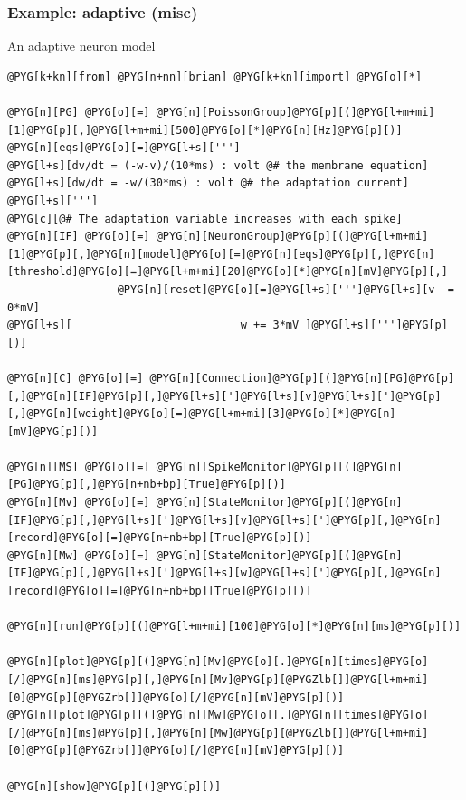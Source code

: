 \documentclass[letterpaper,10pt,english]{manual}
\begin{document}
\hypertarget{index-38}{}\subsubsection{Example: adaptive (misc)}

An adaptive neuron model

\begin{Verbatim}[commandchars=@\[\]]
@PYG[k+kn][from] @PYG[n+nn][brian] @PYG[k+kn][import] @PYG[o][*]

@PYG[n][PG] @PYG[o][=] @PYG[n][PoissonGroup]@PYG[p][(]@PYG[l+m+mi][1]@PYG[p][,]@PYG[l+m+mi][500]@PYG[o][*]@PYG[n][Hz]@PYG[p][)]
@PYG[n][eqs]@PYG[o][=]@PYG[l+s][''']
@PYG[l+s][dv/dt = (-w-v)/(10*ms) : volt @# the membrane equation]
@PYG[l+s][dw/dt = -w/(30*ms) : volt @# the adaptation current]
@PYG[l+s][''']
@PYG[c][@# The adaptation variable increases with each spike]
@PYG[n][IF] @PYG[o][=] @PYG[n][NeuronGroup]@PYG[p][(]@PYG[l+m+mi][1]@PYG[p][,]@PYG[n][model]@PYG[o][=]@PYG[n][eqs]@PYG[p][,]@PYG[n][threshold]@PYG[o][=]@PYG[l+m+mi][20]@PYG[o][*]@PYG[n][mV]@PYG[p][,]
                 @PYG[n][reset]@PYG[o][=]@PYG[l+s][''']@PYG[l+s][v  = 0*mV]
@PYG[l+s][                          w += 3*mV ]@PYG[l+s][''']@PYG[p][)]

@PYG[n][C] @PYG[o][=] @PYG[n][Connection]@PYG[p][(]@PYG[n][PG]@PYG[p][,]@PYG[n][IF]@PYG[p][,]@PYG[l+s][']@PYG[l+s][v]@PYG[l+s][']@PYG[p][,]@PYG[n][weight]@PYG[o][=]@PYG[l+m+mi][3]@PYG[o][*]@PYG[n][mV]@PYG[p][)]

@PYG[n][MS] @PYG[o][=] @PYG[n][SpikeMonitor]@PYG[p][(]@PYG[n][PG]@PYG[p][,]@PYG[n+nb+bp][True]@PYG[p][)]
@PYG[n][Mv] @PYG[o][=] @PYG[n][StateMonitor]@PYG[p][(]@PYG[n][IF]@PYG[p][,]@PYG[l+s][']@PYG[l+s][v]@PYG[l+s][']@PYG[p][,]@PYG[n][record]@PYG[o][=]@PYG[n+nb+bp][True]@PYG[p][)]
@PYG[n][Mw] @PYG[o][=] @PYG[n][StateMonitor]@PYG[p][(]@PYG[n][IF]@PYG[p][,]@PYG[l+s][']@PYG[l+s][w]@PYG[l+s][']@PYG[p][,]@PYG[n][record]@PYG[o][=]@PYG[n+nb+bp][True]@PYG[p][)]

@PYG[n][run]@PYG[p][(]@PYG[l+m+mi][100]@PYG[o][*]@PYG[n][ms]@PYG[p][)]

@PYG[n][plot]@PYG[p][(]@PYG[n][Mv]@PYG[o][.]@PYG[n][times]@PYG[o][/]@PYG[n][ms]@PYG[p][,]@PYG[n][Mv]@PYG[p][@PYGZlb[]]@PYG[l+m+mi][0]@PYG[p][@PYGZrb[]]@PYG[o][/]@PYG[n][mV]@PYG[p][)]
@PYG[n][plot]@PYG[p][(]@PYG[n][Mw]@PYG[o][.]@PYG[n][times]@PYG[o][/]@PYG[n][ms]@PYG[p][,]@PYG[n][Mw]@PYG[p][@PYGZlb[]]@PYG[l+m+mi][0]@PYG[p][@PYGZrb[]]@PYG[o][/]@PYG[n][mV]@PYG[p][)]

@PYG[n][show]@PYG[p][(]@PYG[p][)]
\end{Verbatim}
\end{document}
